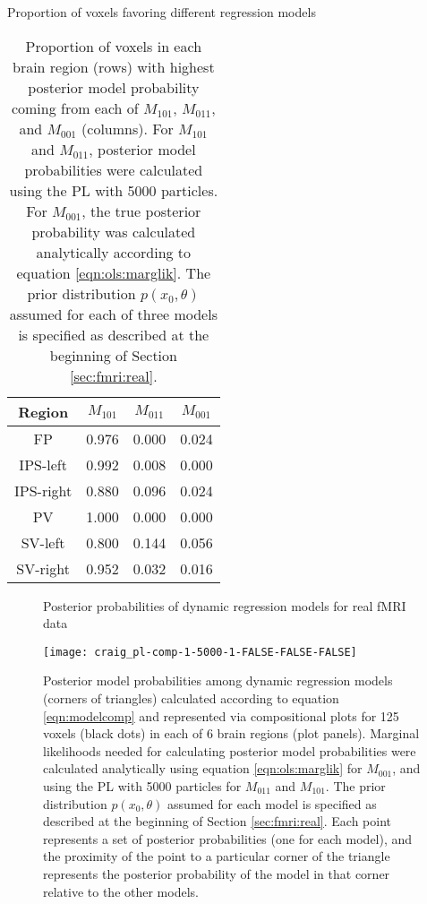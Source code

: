 \begin{table}
\ssp
\centering
\caption{Proportion of voxels favoring different regression models} \label{tab:fmri:favor}
\begin{tabular}{|c|ccc|}
\hline
Region & $M_{101}$ & $M_{011}$ & $M_{001}$ \\
\hline
FP & 0.976 & 0.000 & 0.024 \\
IPS-left & 0.992 & 0.008 & 0.000 \\
IPS-right & 0.880 & 0.096 & 0.024 \\
PV & 1.000 & 0.000 & 0.000 \\
SV-left & 0.800 & 0.144 & 0.056 \\
SV-right & 0.952 & 0.032 & 0.016 \\
\hline
\end{tabular}
\caption*{Proportion of voxels in each brain region (rows) with highest posterior model probability coming from each of $M_{101}$, $M_{011}$, and $M_{001}$ (columns). For $M_{101}$ and $M_{011}$, posterior model probabilities were calculated using the PL with 5000 particles. For $M_{001}$, the true posterior probability was calculated analytically according to equation \eqref{eqn:ols:marglik}. The prior distribution $p(x_0,\theta)$ assumed for each of three models is specified as described at the beginning of Section \ref{sec:fmri:real}.}
\end{table}

\begin{figure}
\ssp
\centering
\caption{Posterior probabilities of dynamic regression models for real fMRI data} \label{fig:fmri:comp:real}
\texttt{[image: craig\_pl-comp-1-5000-1-FALSE-FALSE-FALSE]}
\caption*{Posterior model probabilities among dynamic regression models (corners of triangles) calculated according to equation \eqref{eqn:modelcomp} and represented via compositional plots for 125 voxels (black dots) in each of 6 brain regions (plot panels). Marginal likelihoods needed for calculating posterior model probabilities were calculated analytically using equation \eqref{eqn:ols:marglik} for $M_{001}$, and using the PL with 5000 particles for $M_{011}$ and $M_{101}$. The prior distribution $p(x_0,\theta)$ assumed for each model is specified as described at the beginning of Section \ref{sec:fmri:real}. Each point represents a set of posterior probabilities (one for each model), and the proximity of the point to a particular corner of the triangle represents the posterior probability of the model in that corner relative to the other models.}
\end{figure}

